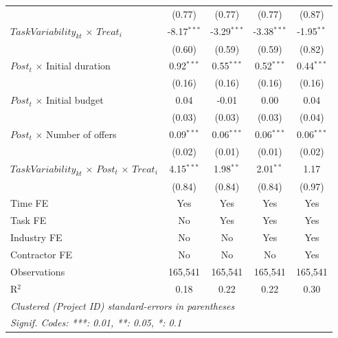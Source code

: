 \documentclass[
]{article}
\begin{document}
\begin{table}[htbp]
\begin{tabular}{lcccc}
                                                                    & (0.77)        & (0.77)        & (0.77)        & (0.87)\\   
      $TaskVariability_{kt}$ $\times$ $Treat_i$                     & -8.17$^{***}$ & -3.29$^{***}$ & -3.38$^{***}$ & -1.95$^{**}$\\   
                                                                    & (0.60)        & (0.59)        & (0.59)        & (0.82)\\   
      $Post_t$ $\times$ Initial duration                            & 0.92$^{***}$  & 0.55$^{***}$  & 0.52$^{***}$  & 0.44$^{***}$\\   
                                                                    & (0.16)        & (0.16)        & (0.16)        & (0.16)\\   
      $Post_t$ $\times$ Initial budget                              & 0.04          & -0.01         & 0.00          & 0.04\\   
                                                                    & (0.03)        & (0.03)        & (0.03)        & (0.04)\\   
      $Post_t$ $\times$ Number of offers                            & 0.09$^{***}$  & 0.06$^{***}$  & 0.06$^{***}$  & 0.06$^{***}$\\   
                                                                    & (0.02)        & (0.01)        & (0.01)        & (0.02)\\   
      $TaskVariability_{kt}$ $\times$ $Post_t$ $\times$ $Treat_i$   & 4.15$^{***}$  & 1.98$^{**}$   & 2.01$^{**}$   & 1.17\\   
                                                                    & (0.84)        & (0.84)        & (0.84)        & (0.97)\\   
      \midrule 
      Time FE                                                       & Yes           & Yes           & Yes           & Yes\\  
      Task FE                                                       & No            & Yes           & Yes           & Yes\\  
      Industry FE                                                   & No            & No            & Yes           & Yes\\  
      Contractor FE                                                 & No            & No            & No            & Yes\\  
      Observations                                                  & 165,541       & 165,541       & 165,541       & 165,541\\  
      R$^2$                                                         & 0.18          & 0.22          & 0.22          & 0.30\\  
      \midrule
      \multicolumn{5}{l}{\emph{Clustered (Project ID) standard-errors in parentheses}}\\
      \multicolumn{5}{l}{\emph{Signif. Codes: ***: 0.01, **: 0.05, *: 0.1}}\\
   \end{tabular}
   

\end{table}
\end{document}
